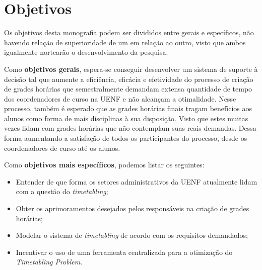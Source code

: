 \section{Objetivos} \label{sec:Objetivos}                %

Os objetivos desta monografia podem ser divididos entre gerais e específicos, não havendo relação de superioridade de um em relação ao outro, visto que ambos igualmente nortearão o desenvolvimento da pesquisa.


Como \textbf{objetivos gerais}, espera-se conseguir desenvolver um sistema de suporte à decisão tal que aumente a eficiência, eficácia e efetividade do processo de criação de grades horárias que semestralmente demandam extensa quantidade de tempo dos coordenadores de curso na UENF e não alcançam a otimalidade. Nesse processo, também é esperado que as grades horárias finais tragam benefícios aos alunos como forma de mais disciplinas à sua disposição. Visto que estes muitas vezes lidam com grades horárias que não contemplam suas reais demandas. Dessa forma aumentando a satisfação de todos os participantes do processo, desde os coordenadores de curso até os alunos.


Como \textbf{objetivos mais específicos}, podemos listar os seguintes:

\begin{itemize}
  \item Entender de que forma os setores administrativos da UENF atualmente lidam com a questão do \textit{timetabling};
  \item Obter os aprimoramentos desejados pelos responsáveis na criação de grades horárias;
  \item Modelar o sistema de \textit{timetabling} de acordo com os requisitos demandados;
  \item Incentivar o uso de uma ferramenta centralizada para a otimização do \textit{Timetabling Problem}.
\end{itemize}

